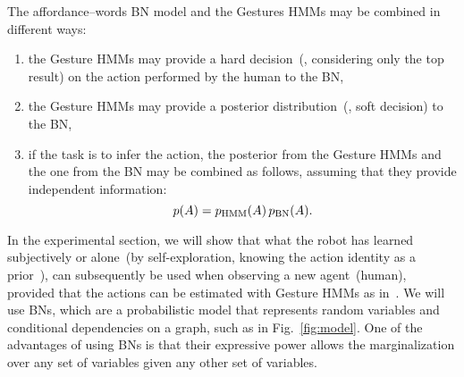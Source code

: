 The affordance--words \ac{BN} model and the Gestures \acp{HMM} may be combined in different ways:
\begin{enumerate}
\item the Gesture \acp{HMM} may provide a hard decision~(\ie, considering only the top result) on the action performed by the human to the \ac{BN},

\item the Gesture \acp{HMM} may provide a posterior distribution~(\ie, soft decision) to the \ac{BN},

\item if the task is to infer the action, the posterior from the Gesture \acp{HMM} and the one from the \ac{BN} may be combined as follows, assuming that they provide independent information:
\begin{equation*}
p(A) = p_{\text{HMM}}(A) \, p_{\text{BN}}(A).
\end{equation*}
\end{enumerate}

%

%
%
%

In the experimental section, we will show that what the robot has learned subjectively or alone~(by self-exploration, knowing the action identity as a prior~\cite{salvi:2012:smcb}), can subsequently be used when observing a new agent~(human), provided that the actions can be estimated with Gesture \acp{HMM} as in~\cite{saponaro:2013:crhri}. We will use \acfp{BN}, which are a probabilistic model that represents random variables and conditional dependencies on a graph, such as in Fig.~\ref{fig:model}. One of the advantages of using \acp{BN} is that their expressive power allows the marginalization over any set of variables given any other set of variables.
